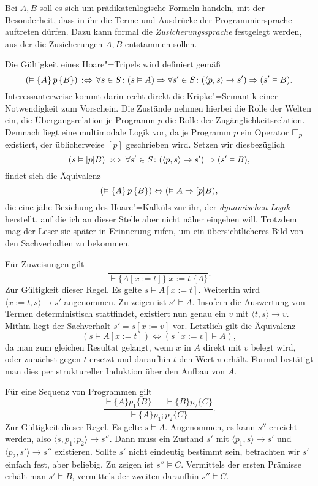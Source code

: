 Bei $A,B$ soll es sich um prädikatenlogische Formeln handeln, mit der
Besonderheit, dass in ihr die Terme und Ausdrücke der Programmiersprache
auftreten dürfen. Dazu kann formal die \emph{Zusicherungssprache}
festgelegt werden, aus der die Zusicherungen $A,B$ entstammen sollen.

Die Gültigkeit eines Hoare"=Tripels wird definiert gemäß
\[(\vDash\{A\}\,p\,\{B\})\,:\Leftrightarrow\,
\forall s\in S\colon (s\vDash A)\Rightarrow\forall s'\in S\colon
(\langle p,s\rangle\to s')\Rightarrow (s'\vDash B).\]
Interessanterweise kommt darin recht direkt die Kripke"=Semantik%
 einer Notwendigkeit zum Vorschein. Die Zustände
nehmen hierbei die Rolle der Welten ein, die Übergangsrelation je
Programm $p$ die Rolle der Zugänglichkeitsrelation. Demnach liegt eine
multimodale Logik vor, da je Programm $p$ ein Operator $\Box_p$ existiert,
der üblicherweise $[p]$ geschrieben wird. Setzen wir diesbezüglich
\[(s\vDash [p]B)\;:\Leftrightarrow\;\forall s'\in S\colon
(\langle p,s\rangle\to s')\Rightarrow (s'\vDash B),\]
findet sich die Äquivalenz
\[(\vDash\{A\}\,p\,\{B\})\Leftrightarrow (\vDash A\Rightarrow [p]B),\]
die eine jähe Beziehung des Hoare"=Kalküls zur ihr, der
\emph{dynamischen Logik}
herstellt, auf die ich an dieser Stelle aber nicht näher eingehen will.
Trotzdem mag der Leser sie später in Erinnerung rufen, um ein
übersichtlicheres Bild von den Sachverhalten zu bekommen.

 Für Zuweisungen gilt
\[\dfrac{}{\vdash\{A[x:=t]\}\; x := t\;\{A\}}.\]
Zur Gültigkeit dieser Regel. Es gelte $s\models A[x:=t]$. Weiterhin
wird $\langle x:=t,s\rangle\to s'$ angenommen. Zu zeigen ist $s'\models A$.
Insofern die Auswertung von Termen deterministisch stattfindet, existiert
nun genau ein $v$ mit $\langle t,s\rangle\to v$. Mithin liegt der
Sachverhalt $s'=s[x:=v]$ vor. Letztlich gilt die Äquivalenz
\[(s\models A[x:=t])\Leftrightarrow (s[x:=v]\models A),\]
da man zum gleichen Resultat gelangt, wenn $x$ in $A$ direkt mit $v$
belegt wird, oder zunächst gegen $t$ ersetzt und daraufhin $t$ den
Wert $v$ erhält. Formal bestätigt man dies per struktureller
Induktion über den Aufbau von $A$.

Für eine Sequenz von Programmen gilt
\[\dfrac{\vdash\{A\}p_1\{B\}\quad\;\;\vdash\{B\}p_2\{C\}}{\vdash\{A\}p_1; p_2\{C\}}.\]
Zur Gültigkeit dieser Regel. Es gelte $s\models A$. Angenommen,
es kann $s''$ erreicht werden, also $\langle s,p_1; p_2\rangle\to s''$.
Dann muss ein Zustand $s'$ mit $\langle p_1,s\rangle\to s'$ und
$\langle p_2,s'\rangle\to s''$ existieren. Sollte $s'$ nicht eindeutig
bestimmt sein, betrachten wir $s'$ einfach fest, aber beliebig. Zu zeigen
ist $s''\models C$. Vermittels der ersten Prämisse erhält man
$s'\models B$, vermittels der zweiten daraufhin $s''\models C$.

